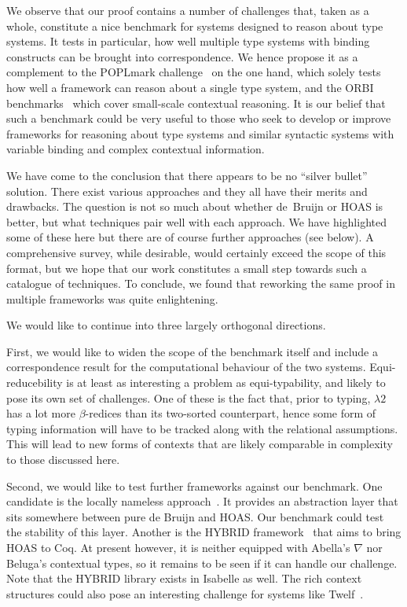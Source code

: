 \documentclass[a4paper,UKenglish]{lipics-v2016}
\newcommand{\SysL}{$\lambda2$\xspace}
\theoremstyle{plain}
\begin{document}
We observe that our proof contains a number of challenges that, taken as a whole, constitute a nice benchmark for systems designed to reason about type systems.
It tests in particular, how well multiple type systems with binding constructs can be brought into correspondence.
We hence propose it as a complement to the POPLmark challenge~\cite{poplmark} on the one hand, which solely tests how well a framework can reason about a single type system, and the ORBI benchmarks~\cite{Felty:ITP10,Felty:orbi-survey} which cover small-scale contextual reasoning.
It is our belief that such a benchmark could be very useful to those who seek to develop or improve frameworks for reasoning about type systems and similar syntactic systems with variable binding and complex contextual information.

We have come to the conclusion that there appears to be no ``silver bullet'' solution.
There exist various approaches and they all have their merits and drawbacks.
The question is not so much about whether de~Bruijn or HOAS is better, but what techniques pair well with each approach.
We have highlighted some of these here but there are of course further approaches (see below).
A comprehensive survey, while desirable, would certainly exceed the scope of this format, but we hope that our work constitutes a small step towards such a catalogue of techniques.
To conclude, we found that reworking the same proof in multiple frameworks was quite enlightening.

We would like to continue into three largely orthogonal directions.

First, we would like to widen the scope of the benchmark itself and include a correspondence result for the computational behaviour of the two systems.
Equi-reducebility is at least as interesting a problem as equi-typability, and likely to pose its own set of challenges.
One of these is the fact that, prior to typing, \SysL has a lot more $\beta$-redices than its two-sorted counterpart, hence some form of typing information will have to be tracked along with the relational assumptions.
This will lead to new forms of contexts that are likely comparable in complexity to those discussed here.

Second, we would like to test further frameworks against our benchmark.
One candidate is the locally nameless approach~\cite{DBLP:conf/popl/AydemirCPPW08}.
It provides an abstraction layer that sits somewhere between pure de Bruijn and HOAS.
Our benchmark could test the stability of this layer.
Another is the HYBRID framework~\cite{DBLP:journals/jar/FeltyM12} that aims to bring HOAS to Coq.
At present however, it is neither equipped with Abella's $\nabla$ nor Beluga's contextual types, so it remains to be seen if it can handle our challenge.
Note that the HYBRID library exists in Isabelle as well.
The rich context structures could also pose an interesting challenge for systems like Twelf~\cite{DBLP:conf/cade/PfenningS99}.
\end{document}
